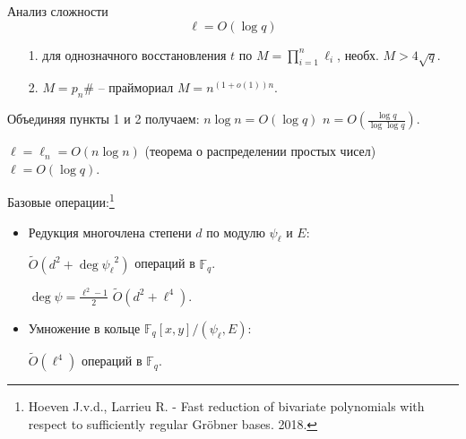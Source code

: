 \documentclass{beamer}
\begin{document}
\begin{frame}{Анализ сложности}
\[\ell = O(\log{q})\]
\ProofBegin
\begin{enumerate}
    \item[1.] для однозначного восстановления $t$ по $M = \prod\limits_{i=1}^{n} \ell_i$, необх. $M > 4 \sqrt{q}$.
    \item[2.] $M = p_n\#$ -- праймориал \MyImplies $M = n^{(1+o(1)) n}$.
\end{enumerate}
Объединяя пункты 1 и 2 получаем: $n \log{n} = O(\log{q})$ \MyImplies $n = O(\frac{\log{q}}{\log{\log{q}}})$.

$\ell = \ell_n = O(n \log{n})$ (теорема о распределении простых чисел) \MyImplies $\ell = O(\log{q})$.

\ProofEnd
\end{frame}

\begin{frame}

Базовые операции:\footnote{Hoeven J.v.d., Larrieu R. - Fast reduction of bivariate polynomials with respect to sufficiently regular Gröbner bases. 2018.}
\begin{itemize}
    \item Редукция многочлена степени $d$ по модулю $\psi_\ell$ и $E$:
    
    $\widetilde{O}(d^2 + \deg{\psi_\ell}^2)$ операций в $\mathbb{F}_q$.
    
    $\deg{\psi} = \frac{\ell^2 - 1}{2}$ \MyImplies $\widetilde{O}(d^2 + \ell^4)$.
    
    \item Умножение в кольце $\mathbb{F}_q[x, y] / (\psi_\ell, E)$:
    
    $\widetilde{O}(\ell^4)$ операций в $\mathbb{F}_q$.
\end{itemize}
\end{frame}
\end{document}
